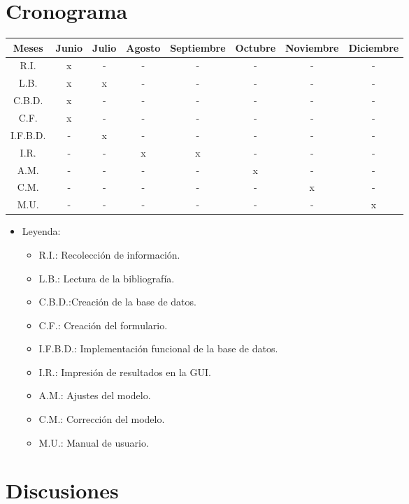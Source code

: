 \documentclass[12pt,a4paper]{report}
\begin{document}
\section{Cronograma}

\begin{center}

\begin{tabular}{|c|c|c|c|c|c|c|c|}
\hline
Meses & Junio & Julio & Agosto & Septiembre & Octubre & Noviembre & Diciembre\\ \hline
R.I. & x &  - & - & - & - & - & - \\ \hline
L.B. & x &  x & - & - & - & - & - \\ \hline
C.B.D. & x &  - & - & - & - & - & - \\ \hline
C.F. & x &  - & - & - & - & - & - \\ \hline
I.F.B.D. & - & x & - & - & - & - & - \\ \hline
I.R. & - &  - & x & x & - & - & - \\ \hline
A.M. & - &  - & - & - & x & - & - \\ \hline
C.M. & - &  - & - & - & - & x & - \\ \hline
M.U. & - &  - & - & - & - & - & x \\ \hline
\end{tabular}

\end{center}

\begin{itemize}
\item Leyenda:
	\begin{itemize}
	\item R.I.: Recolección de información.
	\item L.B.: Lectura de la bibliografía.
	\item C.B.D.:Creación de la base de datos.
	\item C.F.: Creación del formulario.
	\item I.F.B.D.: Implementación funcional de la base de datos.
	\item I.R.: Impresión de resultados en la GUI.
	\item A.M.: Ajustes del modelo.
	\item C.M.: Corrección del modelo.
	\item M.U.: Manual de usuario.
	\end{itemize}
\end{itemize}

\section{Discusiones}
\end{document}

